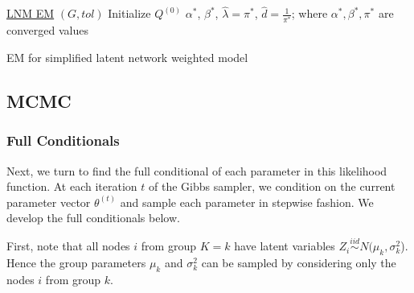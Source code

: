 \documentclass{article}
\begin{document}
\begin{algorithm*}\label{EM_alg_weighted}
    \underline{LNM EM} $(G, tol)$\;
    Initialize $Q^{(0)}$
     \Return $\alpha^*$, $\beta^*$, $\hat{\lambda} = \pi^*$, $\hat{d} = \frac{1}{\pi^*}$; where $\alpha^*, \beta^*, \pi^*$ are converged values \
    \caption{EM for simplified latent network weighted model}
\end{algorithm*}

\subsection{MCMC}\label{MCMC}
\subsubsection{Full Conditionals}
Next, we turn to find the full conditional of each parameter in this likelihood function. At each iteration $t$ of the Gibbs sampler, we condition on the current parameter vector $\theta^{(t)}$ and sample each parameter in stepwise fashion. We develop the full conditionals below.

First, note that all nodes $i$ from group $K = k$ have latent variables $Z_i \overset{iid}\sim N(\mu_k, \sigma_k^2$). Hence the group parameters $\mu_k$ and $\sigma^2_k$ can be sampled by considering only the nodes $i$ from group $k$.
\end{document}
